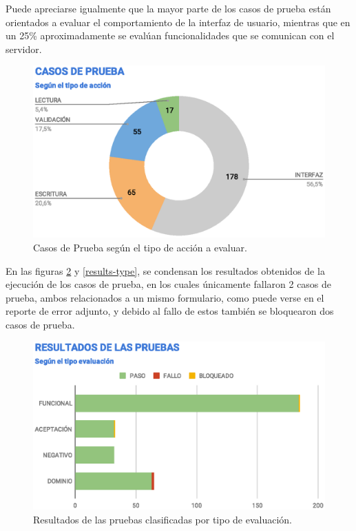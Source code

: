 Puede apreciarse igualmente que la mayor parte de los casos de prueba están
orientados a evaluar el comportamiento de la interfaz de usuario, mientras que
en un 25\% aproximadamente se evalúan funcionalidades que se comunican con el
servidor.

\begin{figure}
\centering
\includegraphics[width=1.0\textwidth]{graphics/tc-type.eps}
\caption{Casos de Prueba según el tipo de acción a evaluar.}
\label{tc-type}
\end{figure}

En las figuras \ref{results-tests} y \ref{results-type}, se condensan los
resultados obtenidos de la ejecución de los casos de prueba, en los cuales
únicamente fallaron 2 casos de prueba, ambos relacionados a un mismo formulario,
como puede verse en el reporte de error adjunto, y debido al fallo de estos
también se bloquearon dos casos de prueba.

\begin{figure}
\centering
\includegraphics[width=1.0\textwidth]{graphics/results-tests.eps}
\caption{Resultados de las pruebas clasificadas por tipo de evaluación.}
\label{results-tests}
\end{figure}

